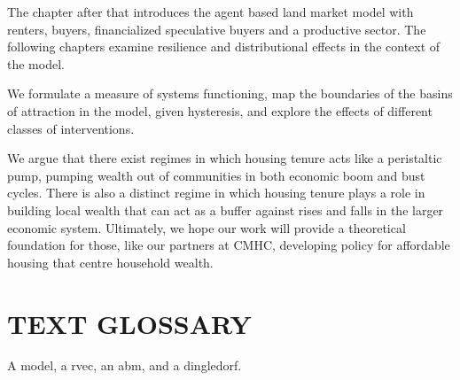 The chapter after that introduces the agent based land market model with renters, buyers, financialized speculative buyers and a productive sector. 
The following chapters examine resilience and distributional effects in the context of the model. 


We formulate a measure of systems functioning, map the boundaries of the basins of attraction in the model, given hysteresis, and explore the effects of different classes of interventions. %

We argue that there exist regimes in which housing tenure acts like a peristaltic pump, pumping wealth out of communities in both economic boom and bust cycles. There is also a distinct regime in which housing tenure plays a role in building local wealth that can act as a buffer against rises and falls in the larger economic system. Ultimately, we hope our work will provide a theoretical foundation for those, like our partners at CMHC, developing policy for affordable housing that centre household wealth. 



\section{TEXT GLOSSARY}

A \gls{model}, a \gls{rvec}, an \gls{abm}, and a \gls{dingledorf}.